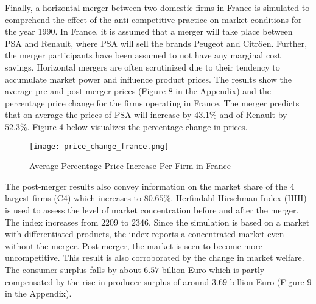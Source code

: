 \documentclass[a4paper,11pt]{article}
\begin{document}
    Finally, a horizontal merger between two domestic firms in France is simulated to comprehend the effect of the anti-competitive practice on market conditions for the year 1990. In France, it is assumed that a merger will take place between PSA and Renault, where PSA will sell the brands Peugeot and Citröen. Further, the merger participants have been assumed to not have any marginal cost savings. Horizontal mergers are often scrutinized due to their tendency to accumulate market power and influence product prices. The results show the average pre and post-merger prices (Figure 8 in the Appendix) and the percentage price change for the firms operating in France. The merger predicts that on average the prices of PSA will increase by $43.1\%$ and of Renault by $52.3\%$. Figure 4 below visualizes the percentage change in prices.\\ 

    \begin{figure}[htb]
        \centering
        \texttt{[image: price\_change\_france.png]}
        \caption{Average Percentage Price Increase Per Firm in France}
        \label{fig: Price Increase}
    \end{figure}
    
    The post-merger results also convey information on the market share of the 4 largest firms (C4) which increases to $80.65\%$. Herfindahl-Hirschman Index (HHI) is used to assess the level of market concentration before and after the merger. The index increases from $2209$ to $2346$. Since the simulation is based on a market with differentiated products, the index reports a concentrated market even without the merger. Post-merger, the market is seen to become more uncompetitive. This result is also corroborated by the change in market welfare. The consumer surplus falls by about $6.57$ billion Euro which is partly compensated by the rise in producer surplus of around $3.69$ billion Euro (Figure 9 in the Appendix).\\
\end{document}

